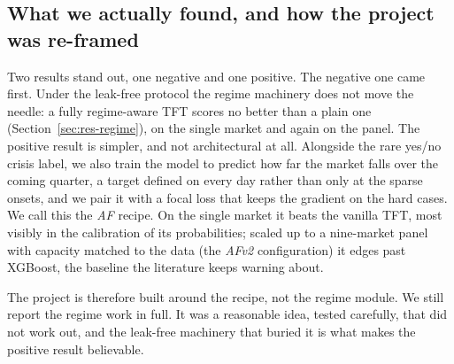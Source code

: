 \documentclass[11pt,a4paper]{article}
\begin{document}
\subsection{What we actually found, and how the project was re-framed}
Two results stand out, one negative and one positive. The negative one came
first. Under the leak-free protocol the regime machinery does not move the
needle: a fully regime-aware TFT scores no better than a plain one
(Section~\ref{sec:res-regime}), on the single market and again on the panel.
The positive result is simpler, and not architectural at all. Alongside the
rare yes/no crisis label, we also train the model to predict how far the market
falls over the coming quarter, a target defined on every day rather than only
at the sparse onsets, and we pair it with a focal loss that keeps the gradient
on the hard cases. We call this the \emph{AF} recipe. On the single market it
beats the vanilla TFT, most visibly in the calibration of its probabilities;
scaled up to a nine-market panel with capacity matched to the data (the
\emph{AFv2} configuration) it edges past XGBoost, the baseline the literature
keeps warning about.

The project is therefore built around the recipe, not the regime module. We
still report the regime work in full. It was a reasonable idea, tested
carefully, that did not work out, and the leak-free machinery that buried it is
what makes the positive result believable.
\end{document}
